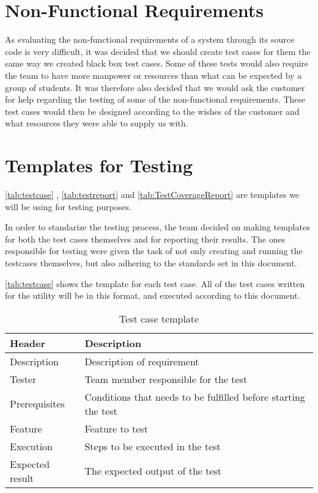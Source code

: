 \section{Non-Functional Requirements}
As evaluating the non-functional requirements of a system through its source code is very difficult, it was decided that we should create test cases for them the same way we created black box test cases. Some of these tests would also require the team to have more manpower or resources than what can be expected by a group of students. It was therefore also decided that we would ask the customer for help regarding the testing of some of the non-functional requirements. These test cases would then be designed according to the wishes of the customer and what resources they were able to supply us with.

\section{Templates for Testing}
\autoref{tab:testcase} , \autoref{tab:testreport} and \autoref{tab:TestCoverageReport} are templates we will be
using for testing purposes.

In order to standarize the testing process, the team decided on making templates for both the test cases themselves and for reporting their results. The ones responsible for testing were given the task of not only creating and running the testcases themselves, but also adhering to the standards set in this document.

\autoref{tab:testcase} shows the template for each test case. All of the test cases written for the \gls{utility} will be in this format, and executed according to this document.

\begin{table}[htb] \small \center
\caption{Test case template \label{tab:testcase}}
\begin{tabular}{l l}
	\toprule
	Header & Description \\
	\midrule
	Description & Description of requirement \\
	Tester & Team member responsible for the test \\
	Prerequisites & Conditions that needs to be fulfilled before starting the test \\
	Feature & Feature to test \\
	Execution & Steps to be executed in the test \\
	Expected result & The expected output of the test \\
	\bottomrule
\end{tabular}
\end{table}

